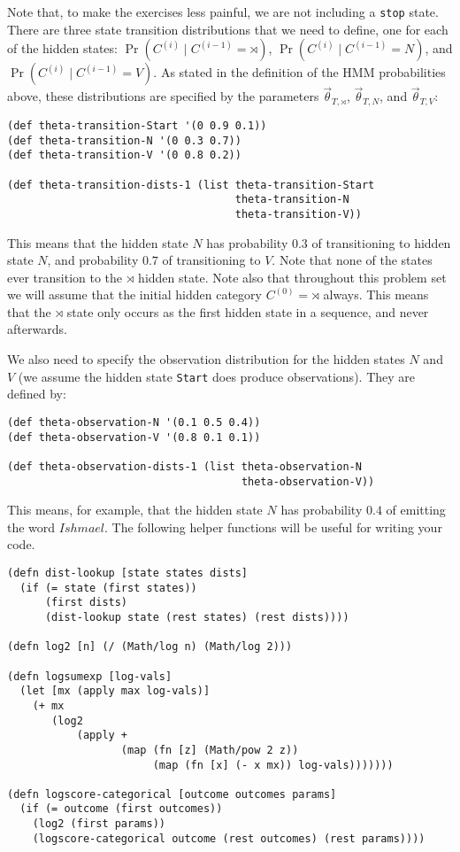\documentclass[10pt]{article}
\begin{document}
Note that, to make the exercises less painful, we are not including a
\texttt{stop} state. There are three state transition distributions
that we need to define, one for each of the hidden states:
$\Pr(C^{(i)} \mid C^{(i-1)}=\rtimes)$, $\Pr(C^{(i)} \mid C^{(i-1)}=N)$,
and $\Pr(C^{(i)} \mid C^{(i-1)}=V)$. As stated in the definition of
the HMM probabilities above, these distributions are specified by the
parameters $\vec{\theta}_{T, \rtimes}$, $\vec{\theta}_{T, N}$, and
$\vec{\theta}_{T, V}$:

\begin{lstlisting}
(def theta-transition-Start '(0 0.9 0.1))
(def theta-transition-N '(0 0.3 0.7))
(def theta-transition-V '(0 0.8 0.2))

(def theta-transition-dists-1 (list theta-transition-Start
                                    theta-transition-N
                                    theta-transition-V))
\end{lstlisting}

This means that the hidden state $N$ has probability $0.3$ of transitioning to
hidden state $N$, and probability $0.7$ of transitioning to $V$. Note that none
of the states ever transition to the $\rtimes$ hidden state.  Note also
that throughout this problem set we will assume that the initial hidden category
$C^{(0)}=\rtimes$ always.  This means that the $\rtimes$ state only occurs as
the first hidden state in a sequence, and never afterwards.

We also need to specify the observation distribution for the hidden
states $N$ and $V$ (we assume the hidden state \texttt{Start} does produce
observations). They are defined by:

\begin{lstlisting}
(def theta-observation-N '(0.1 0.5 0.4))
(def theta-observation-V '(0.8 0.1 0.1))

(def theta-observation-dists-1 (list theta-observation-N
                                     theta-observation-V))
\end{lstlisting}

This means, for example, that the hidden state $N$ has probability
$0.4$ of emitting the word $Ishmael$. The following helper functions
will be useful for writing your code.

\begin{lstlisting}
(defn dist-lookup [state states dists]
  (if (= state (first states))
      (first dists)
      (dist-lookup state (rest states) (rest dists))))

(defn log2 [n] (/ (Math/log n) (Math/log 2)))

(defn logsumexp [log-vals]
  (let [mx (apply max log-vals)]
    (+ mx
       (log2
           (apply +
                  (map (fn [z] (Math/pow 2 z))
                       (map (fn [x] (- x mx)) log-vals)))))))

(defn logscore-categorical [outcome outcomes params]
  (if (= outcome (first outcomes))
    (log2 (first params))
    (logscore-categorical outcome (rest outcomes) (rest params))))
\end{lstlisting}
\end{document}

